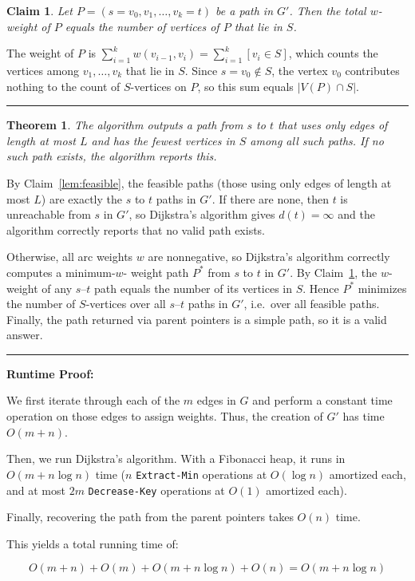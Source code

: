 \documentclass[11pt]{article}
\newenvironment{proof}{{\bf Proof:  }}{\hfill\rule{2mm}{2mm}}
\newtheorem{theorem}[fact]{Theorem}
\newtheorem{claim}[fact]{Claim}
\begin{document}
\begin{claim}\label{lem:cost}
Let $P = (s = v_0, v_1, \dots, v_k = t)$ be a path in $G'$. Then the total $w$-weight of $P$ equals the number of vertices of $P$ that lie in $S$.
\end{claim}

\begin{proof}
The weight of $P$ is $\sum_{i=1}^{k} w(v_{i-1}, v_i) = \sum_{i=1}^{k} [v_i \in S]$, which counts the vertices among $v_1,\dots,v_k$ that lie in $S$. 
Since $s = v_0 \notin S$, the vertex $v_0$ contributes nothing to the count of $S$-vertices on $P$, so this sum equals $|V(P) \cap S|$.
\end{proof}

\begin{theorem}
The algorithm outputs a path from $s$ to $t$ that uses only edges of length at most $L$ and has the fewest vertices in $S$ among all such paths. 
If no such path exists, the algorithm reports this.
\end{theorem}

\begin{proof}
By Claim~\ref{lem:feasible}, the feasible paths (those using only edges of length at most $L$) are exactly the $s$ to $t$ paths in $G'$. 
If there are none, then $t$ is unreachable from $s$ in $G'$, so Dijkstra's algorithm gives $d(t) = \infty$ 
and the algorithm correctly reports that no valid path exists.

Otherwise, all arc weights $w$ are nonnegative, so Dijkstra's algorithm correctly computes a minimum-$w$- weight path $P^*$ from $s$ to $t$ in $G'$. 
By Claim~\ref{lem:cost}, the $w$-weight of any $s$--$t$ path equals the number of its vertices in $S$. 
Hence $P^*$ minimizes the number of $S$-vertices over all $s$--$t$ paths in $G'$, i.e.\ over all feasible paths. 
Finally, the path returned via parent pointers is a simple path, so it is a valid answer.
\end{proof}

\bigbreak

\textbf{Runtime Proof:}

We first iterate through each of the $m$ edges in $G$ and perform a constant time operation on those edges to assign weights. 
Thus, the creation of $G'$ has time $O(m + n)$. 

Then, we run Dijkstra's algorithm. 
With a Fibonacci heap, it runs in $O(m + n \log n)$ time ($n$ \texttt{Extract-Min} operations at $O(\log n)$ amortized each, 
and at most $2m$ \texttt{Decrease-Key} operations at $O(1)$ amortized each). 

Finally, recovering the path from the parent pointers takes $O(n)$ time. 

This yields a total running time of:

$$O(m + n) + O(m) + O(m + n \log n) + O(n) = O(m + n \log n)$$
\end{document}
